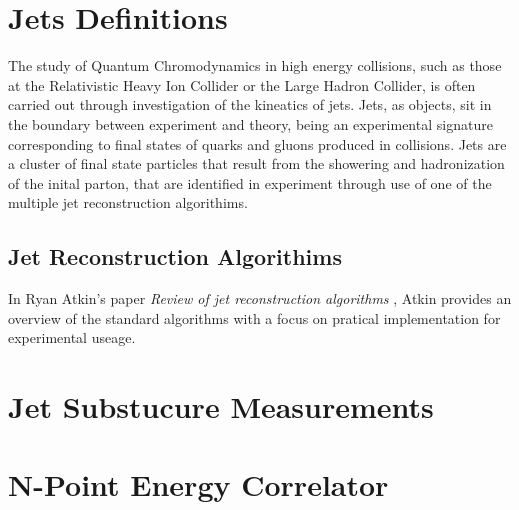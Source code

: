 %
\section{Jets Definitions}
The study of Quantum Chromodynamics in high energy collisions, such as those at the Relativistic Heavy Ion Collider or the Large Hadron Collider, is often carried out through investigation of the kineatics of jets.
Jets, as objects, sit in the boundary between experiment and theory, being an experimental signature corresponding to final states of quarks and gluons produced in collisions. 
Jets are a cluster of final state particles that result from the showering and hadronization of the inital parton, that are identified in experiment through use of one of the multiple jet reconstruction algorithims. 
\subsection{Jet Reconstruction Algorithims}
In Ryan Atkin's paper \textit{Review of jet reconstruction algorithms} \cite{Atkin2015}, Atkin provides an overview of the standard algorithms with a focus on pratical implementation for experimental useage. 
\section{Jet Substucure Measurements}
\section{N-Point Energy Correlator}
%
